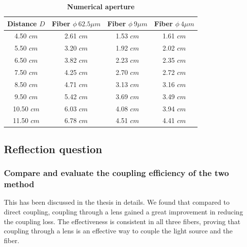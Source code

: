 \documentclass[12pt,a4paper,UTF8]{article}
\begin{document}
    \begin{table}[htbp]
        \centering
            \begin{tabular}{cccc}
                \toprule
                Distance $D$ & Fiber $\phi \ 62.5 \mu m$ & Fiber $\phi \ 9 \mu m$ & Fiber $\phi \ 4 \mu m$ \\
                \midrule
                4.50 $cm$ & 2.61 $cm$ & 1.53 $cm$ & 1.61 $cm$ \\
                5.50 $cm$ & 3.20 $cm$ & 1.92 $cm$ & 2.02 $cm$ \\
                6.50 $cm$ & 3.82 $cm$ & 2.23 $cm$ & 2.35 $cm$ \\
                7.50 $cm$ & 4.25 $cm$ & 2.70 $cm$ & 2.72 $cm$ \\
                8.50 $cm$ & 4.71 $cm$ & 3.13 $cm$ & 3.16 $cm$ \\
                9.50 $cm$ & 5.42 $cm$ & 3.69 $cm$ & 3.49 $cm$ \\
                10.50 $cm$ & 6.03 $cm$ & 4.08 $cm$ & 3.94 $cm$ \\
                11.50 $cm$ & 6.78 $cm$ & 4.51 $cm$ & 4.41 $cm$ \\
                \bottomrule
            \end{tabular}
            \caption{\textbf{Numerical aperture}}
            \label{tab.1.3}
    \end{table}	

    \subsection{Reflection question}
        \subsubsection{Compare and evaluate the coupling efficiency of the two method}
        This  has been discussed in the thesis in details. We found that compared to direct coupling, coupling through a lens gained a great improvement in reducing the coupling loss.
        The effectiveness is consistent in all three fibers, proving that coupling through a lens is an effective way to couple the light source and the fiber.
\end{document}
